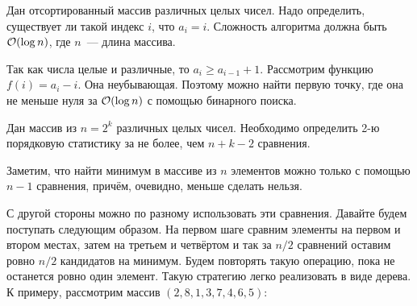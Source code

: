\documentclass[addpoints]{exam}
\begin{document}
\begin{questions}
\question[1] Дан отсортированный массив различных целых чисел. Надо определить, существует ли такой индекс $i$, что $a_i = i$. Сложность алгоритма должна быть $\mathcal{O}(\log{n})$, где $n$~--- длина массива.

\begin{solution}

Так как числа целые и различные, то $a_i \geqslant a_{i - 1} + 1$. Рассмотрим функцию $f(i) = a_i - i$. Она неубывающая. Поэтому можно найти первую точку, где она не меньше нуля за $\mathcal{O}(\log{n})$ с помощью бинарного поиска.

\end{solution}

\question[1 \half] Дан массив из $n = 2^k$ различных целых чисел. Необходимо определить 2-ю порядковую статистику за не более, чем $n + k - 2$ сравнения.

\begin{solution}


Заметим, что найти минимум в массиве из $n$ элементов можно только с помощью $n-1$ сравнения, причём, очевидно, меньше сделать нельзя.

С другой стороны можно по разному использовать эти сравнения. Давайте будем поступать следующим образом. На первом шаге сравним элементы на первом и втором местах, затем на третьем и четвёртом и так за $n/2$ сравнений оставим ровно $n/2$ кандидатов на минимум. Будем повторять такую операцию, пока не останется ровно один элемент. Такую стратегию легко реализовать в виде дерева. К примеру, рассмотрим массив $(2,8,1,3,7,4,6,5)$:

\begin{center}
\end{center}


\end{solution}
\end{questions}
\end{document}
